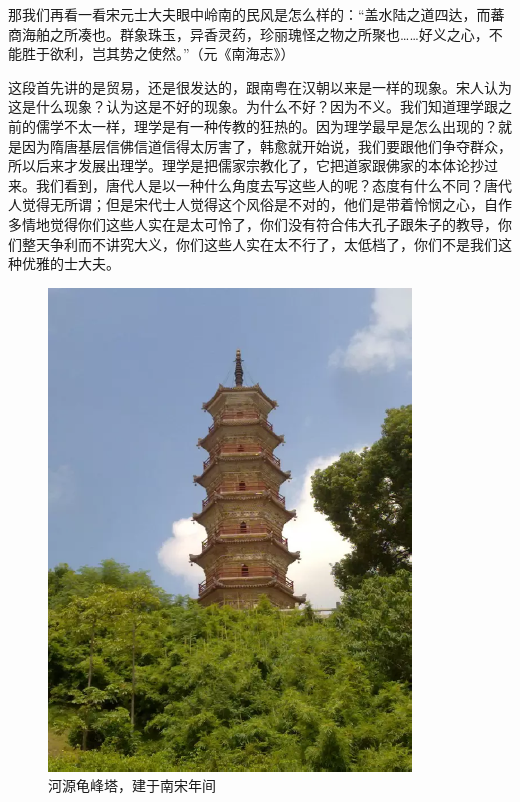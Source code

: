 那我们再看一看宋元士大夫眼中岭南的民风是怎么样的：“盖水陆之道四达，而蕃商海舶之所凑也。群象珠玉，异香灵药，珍丽瑰怪之物之所聚也……好义之心，不能胜于欲利，岂其势之使然。”（元《南海志》）

这段首先讲的是贸易，还是很发达的，跟南粤在汉朝以来是一样的现象。宋人认为这是什么现象？认为这是不好的现象。为什么不好？因为不义。我们知道理学跟之前的儒学不太一样，理学是有一种传教的狂热的。因为理学最早是怎么出现的？就是因为隋唐基层信佛信道信得太厉害了，韩愈就开始说，我们要跟他们争夺群众，所以后来才发展出理学。理学是把儒家宗教化了，它把道家跟佛家的本体论抄过来。我们看到，唐代人是以一种什么角度去写这些人的呢？态度有什么不同？唐代人觉得无所谓；但是宋代士人觉得这个风俗是不对的，他们是带着怜悯之心，自作多情地觉得你们这些人实在是太可怜了，你们没有符合伟大孔子跟朱子的教导，你们整天争利而不讲究大义，你们这些人实在太不行了，太低档了，你们不是我们这种优雅的士大夫。

\begin{figure}
	\centering
	\includegraphics[width=\textwidth]{images/image-40}
	\caption{河源龟峰塔，建于南宋年间}
\end{figure}

